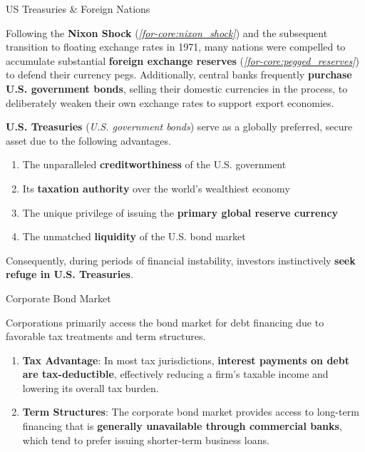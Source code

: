 \documentclass[10pt]{article}
\begin{document}
  \begin{core}{US Treasuries \& Foreign Nations}

    Following the \textbf{Nixon Shock} (\textit{\autoref{for-core:nixon_shock}}) and the subsequent transition to floating exchange rates in 1971, many nations were compelled to accumulate substantial \textbf{foreign exchange reserves} (\textit{\autoref{for-core:pegged_reserves}}) to defend their currency pegs. Additionally, central banks frequently \textbf{purchase U.S. government bonds}, selling their domestic currencies in the process, to deliberately weaken their own exchange rates to support export economies. 

    \textbf{U.S. Treasuries} (\textit{U.S. government bonds}) serve as a globally preferred, secure asset due to the following advantages.

    \begin{enumerate}

      \item The unparalleled \textbf{creditworthiness} of the U.S. government

      \item Its \textbf{taxation authority} over the world's wealthiest economy

      \item The unique privilege of issuing the \textbf{primary global reserve currency}

      \item The unmatched \textbf{liquidity} of the U.S. bond market

    \end{enumerate}

    Consequently, during periods of financial instability, investors instinctively \textbf{seek refuge in U.S. Treasuries}. 

  \end{core}

  \begin{core}{Corporate Bond Market}

    Corporations primarily access the bond market for debt financing due to favorable tax treatments and term structures. 

    \begin{enumerate}

      \item \textbf{Tax Advantage}: In most tax jurisdictions, \textbf{interest payments on debt are tax-deductible}, effectively reducing a firm's taxable income and lowering its overall tax burden. 

      \item \textbf{Term Structures}: The corporate bond market provides access to long-term financing that is \textbf{generally unavailable through commercial banks}, which tend to prefer issuing shorter-term business loans.

    \end{enumerate}

  \end{core}
\end{document}
